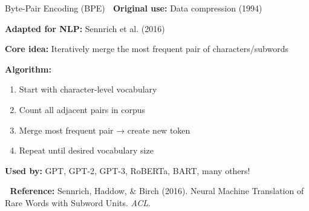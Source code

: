 \documentclass[aspectratio=169]{beamer}
\begin{document}
\begin{frame}{Byte-Pair Encoding (BPE) 🔧}
    \textbf{Original use:} Data compression (1994)

    \textbf{Adapted for NLP:} Sennrich et al. (2016)

    \vspace{0.5em}
    \textbf{Core idea:} Iteratively merge the most frequent pair of characters/subwords

    \vspace{0.5em}
    \textbf{Algorithm:}
    \begin{enumerate}\setlength{\itemsep}{0pt}
        \item Start with character-level vocabulary
        \item Count all adjacent pairs in corpus
        \item Merge most frequent pair → create new token
        \item Repeat until desired vocabulary size
    \end{enumerate}

    \vspace{0.5em}
    \textbf{Used by:} GPT, GPT-2, GPT-3, RoBERTa, BART, many others!

    \vspace{0.5em}
    📖 \textbf{Reference:} Sennrich, Haddow, \& Birch (2016). Neural Machine Translation of Rare Words with Subword Units. \textit{ACL}.
\end{frame}
\end{document}
